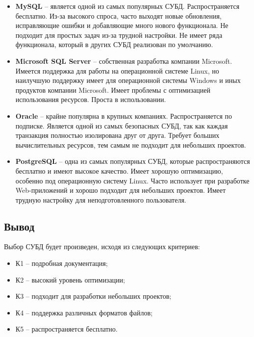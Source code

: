 \begin{itemize}
    \item \textbf{MySQL} \cite{mysql} -- является одной из самых популярных СУБД. Распространяется бесплатно. Из-за высокого спроса, часто выходят новые обновления, исправляющие ошибки и добавляющие много нового функционала. Не подходит для простых задач из-за трудной настройки. Не имеет ряда функционала, который в других СУБД реализован по умолчанию.
    \item \textbf{Microsoft SQL Server} \cite{sqlserver} -- собственная разработка компании Microsoft. Имеется поддержка для работы на операционной системе Linux, но наилучшую поддержку имеет для операционной системы Windows и иных продуктов компании Microsoft. Имеет проблемы с оптимизацией использования ресурсов. Проста в использовании.

    \item \textbf{Oracle} \cite{oracle} -- крайне популярна в крупных компаниях. Распространяется по подписке. Является одной из самых безопасных СУБД, так как каждая транзакция полностью изолирована друг от друга. Требует больших вычислительных ресурсов, тем самым не подходит для небольших проектов.

    \item \textbf{PostgreSQL} \cite{postgres} -- одна из самых популярных СУБД, которые распространяются бесплатно и имеют высокое качество. Имеет хорошую оптимизацию, особенно под операционную систему Linux. Часто использует при разработке Web-приложений и хорошо подходит для небольших проектов. Имеет трудную настройку для неподготовленного пользователя.
\end{itemize}


\subsection{Вывод}

Выбор СУБД будет произведен, исходя из следующих критериев:

\begin{itemize}
    \item К1 -- подробная документация;
    \item К2 -- высокий уровень оптимизации;
    \item К3 -- подходит для разработки небольших проектов;
    \item К4 -- поддержка различных форматов файлов;
    \item К5 -- распространяется бесплатно.
\end{itemize}

